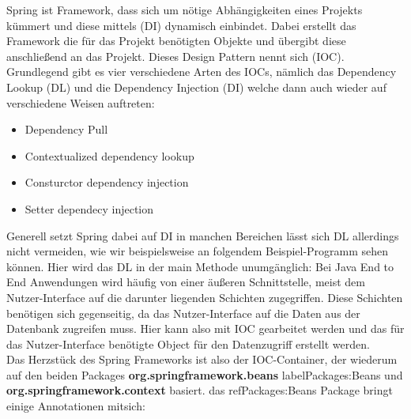 

        Spring ist Framework, dass sich um nötige Abhängigkeiten eines
        Projekts kümmert und diese mittels  (DI) dynamisch einbindet.
        Dabei
        erstellt das Framework die für das Projekt benötigten Objekte
        und übergibt diese anschließend an das Projekt. Dieses Design
        Pattern nennt sich (IOC).
        Grundlegend gibt es vier verschiedene Arten des IOCs, nämlich
        das Dependency Lookup (DL) und die Dependency Injection (DI)
        welche dann auch wieder auf verschiedene Weisen auftreten: 
        \begin{itemize}
            \item Dependency Pull
            \item Contextualized dependency lookup
            \item Consturctor dependency injection
            \item Setter dependecy injection
        \end{itemize} 
        Generell setzt Spring dabei auf DI in manchen Bereichen lässt
        sich DL allerdings nicht vermeiden, wie wir beispielsweise an
        folgendem Beispiel-Programm sehen können. Hier wird das DL in
        der main Methode unumgänglich:
        Bei Java End to End Anwendungen wird häufig von einer äußeren
        Schnittstelle, meist dem Nutzer-Interface auf die darunter
        liegenden Schichten zugegriffen. Diese Schichten benötigen
        sich gegenseitig, da das Nutzer-Interface auf die Daten aus
        der Datenbank zugreifen muss. Hier kann also mit IOC
        gearbeitet werden und das für das Nutzer-Interface benötigte
        Object für den Datenzugriff erstellt
        werden.\\ 
        Das Herzstück des Spring Frameworks ist also der
        IOC-Container, der wiederum auf den beiden Packages
        \textbf{org.springframework.beans} label{Packages:Beans} und
        \textbf{org.springframework.context} basiert.
        das ref{Packages:Beans} Package bringt einige Annotationen
        mitsich:
